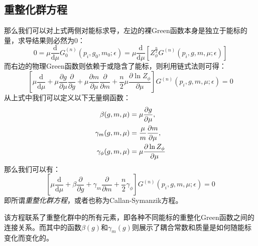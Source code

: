 \subsection{重整化群方程}
那么我们可以对上式两侧对能标求导，左边的裸Green函数本身是独立于能标的量，求导结果则必然为0：
\begin{equation}
0=\mu\frac{\mathrm{d}}{\mathrm{d}\mu}G^{(n)}_0(p_i,g_0,m_0;\epsilon)=\mu\frac{\mathrm{d}}{\mathrm{d}\mu}\left[Z_\phi^{\frac{n}{2}}G^{(n)}(p_i,g,m,\mu;\epsilon)\right]
\end{equation}
而右边的物理Green函数则依赖于或隐含了能标，则利用链式法则可得：
\begin{equation}
\left[\mu\frac{\mathrm{d}}{\mathrm{d}\mu}+\mu\frac{\partial g}{\partial\mu}\frac{\partial}{\partial g}+\mu\frac{\partial m}{\partial\mu}\frac{\partial}{\partial m}+\frac{n}{2}\mu\frac{\partial\ln Z_\phi}{\partial\mu}\right]G^{(n)}(p_i,g,m,\mu;\epsilon)=0
\end{equation}
从上式中我们可以定义以下无量纲函数：
\begin{align}
\beta(g,m,\mu)&=\mu\frac{\partial g}{\partial\mu},\notag\\
\gamma_m(g,m,\mu)&=\frac{\mu}{m}\frac{\partial m}{\partial\mu},\notag\\
\gamma_\phi(g,m,\mu)&=\mu\frac{\partial\ln Z_\phi}{\partial\mu}
\end{align}
那么我们可以有：
\begin{equation}
\left[\mu\frac{\mathrm{d}}{\mathrm{d}\mu}+\beta\frac{\partial}{\partial g}+\gamma_m\frac{\partial}{\partial m}+\frac{n}{2}\gamma_\phi\right]G^{(n)}(p_i,g,m,\mu;\epsilon)=0
\end{equation}
即所谓\emph{重整化群方程}，或者也称为Callan-Symanzik方程。

该方程联系了重整化群中的所有元素，即各种不同能标的重整化Green函数之间的连接关系。而其中的函数$\beta(g)$和$\gamma_m(g)$则展示了耦合常数和质量是如何随能标变化而变化的。


